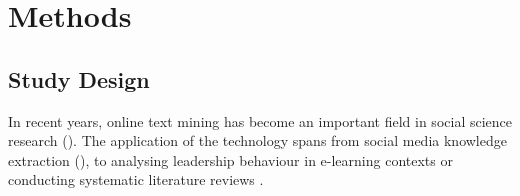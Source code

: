 







\section{Methods}\label{Methods}
\subsection{Study Design}\label{Study Design}
In recent years, online text mining has become an important field in social science research (\cites[pp. 37 ff.]{Ignatow2018}{Shumate2016}). The application of the technology spans from social media knowledge extraction (\cite{A.Salloumetal.2017}), to analysing leadership behaviour in e-learning contexts \parencite{Xie2018} or conducting systematic literature reviews \parencite{Mergel2018}.

